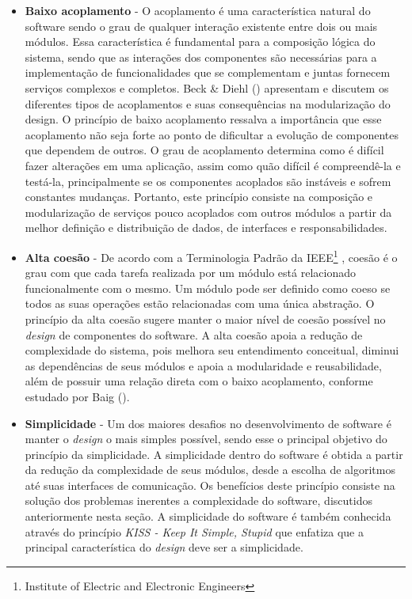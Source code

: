 \begin{itemize}
\item \textbf{Baixo acoplamento} - O acoplamento é uma característica natural do software sendo o grau de qualquer interação existente entre dois ou mais módulos.
%
Essa característica é fundamental para a composição lógica do sistema, sendo que as interações dos componentes são necessárias para a implementação de funcionalidades que se complementam e juntas fornecem serviços complexos e completos.
%
Beck \& Diehl (\citeyear{diehl2011}) apresentam e discutem os diferentes tipos de acoplamentos e suas consequências na modularização do design.
%
O princípio de baixo acoplamento ressalva a importância que esse acoplamento não seja forte ao ponto de dificultar a evolução de componentes que dependem de outros.
%
O grau de acoplamento determina como é difícil fazer alterações em uma aplicação, assim como quão difícil é compreendê-la e testá-la, principalmente se os componentes acoplados são instáveis e sofrem constantes mudanças.
%
Portanto, este princípio consiste na composição e modularização de serviços pouco acoplados com outros módulos a partir da melhor definição e distribuição de dados, de interfaces e responsabilidades.

\item \textbf{Alta coesão} - De acordo com a Terminologia Padrão da IEEE\footnote{Institute of Electric and Electronic Engineers} \cite{ieee1990}, coesão é o grau com que cada tarefa realizada por um módulo está relacionado funcionalmente com o mesmo.
%
Um módulo pode ser definido como coeso se todos as suas operações estão relacionadas com uma única abstração.
%
O princípio da alta coesão sugere manter o maior nível de coesão possível no \emph{design} de componentes do software.
%
A alta coesão apoia a redução de complexidade do sistema, pois melhora seu entendimento conceitual, diminui as dependências de seus módulos e apoia a modularidade e reusabilidade, além de possuir uma relação direta com o baixo acoplamento, conforme estudado por Baig (\citeyear{baig2004}).

\item \textbf{Simplicidade} - Um dos maiores desafios no desenvolvimento de software é manter o \emph{design} o mais simples possível, sendo esse o principal objetivo do princípio da simplicidade.
%
A simplicidade dentro do software é obtida a partir da redução da complexidade de seus módulos, desde a escolha de algoritmos até suas interfaces de comunicação.
%
Os benefícios deste princípio consiste na solução dos problemas inerentes a complexidade do software, discutidos anteriormente nesta seção.
%
A simplicidade do software é também conhecida através do princípio \emph{KISS - Keep It Simple, Stupid} que enfatiza que a principal característica do \emph{design} deve ser a simplicidade.

\end{itemize}


